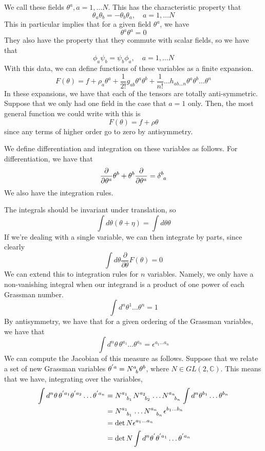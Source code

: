 \documentclass[11pt, oneside]{article}   	%
\theoremstyle{slanted}
\begin{document}
We call these fields $ \theta ^ a , a  = 1, \dots N $. 
This has the characteristic property that 
\[
 \theta_ a \theta _ b  =  - \theta_ b \theta _ a , \quad a = 1 , \dots N 
\] 
This in particular implies that 
for a given field $ \theta ^ a $, we have 
\[
 \theta ^ a \theta ^ a  =0
\] They also 
have the property that they commute with 
scalar fields, 
so we have that 
\[
 \phi _ a \psi _ b  = \psi _ b \phi _ a , \quad a = 1 , \dots N 
\] 
With this data, we can define functions 
of these variables as a finite expansion.  
\[
 F \left( \theta  \right)  = f + \rho _ a \theta ^ a 	
 + \frac{1}{2 ! }g _{ ab } \theta ^a \theta ^ b + \frac{1}{n ! }\dots h_{ ab \dots n } \theta ^ a \theta ^ b 
 \dots \theta ^ n 
\] In these 
expansions, we have that each of the 
tensors are totally anti-symmetric.
Suppose that we only had one field 
in the case that $ a = 1 $ only. 
Then, the most 
general function we could write with this is 
\[
 F \left( \theta  \right)   = f + \rho \theta 
\] since any terms of higher order 
go to zero by antisymmetry. 

We define differentiation and 
integration on these variables as follows.
For differentiation, we have that 
\[
 \frac{\partial}{\partial \theta ^ a  } \theta ^ b + \theta ^ b \frac{\partial   }{\partial  \theta ^ a }  
  = \delta \indices{ ^ b _ a }  
\] We 
also have the integration rules. 

The integrals should be invariant under 
translation, so 
\[
	\int d \theta \left( \theta + \eta  \right)   = \int d \theta \theta 
\] If we're dealing with a single variable, 
we can then integrate by parts, since clearly 
\[
	\int d \theta \frac{\partial   }{\partial  \theta }  F \left( \theta  \right)    = 0 	 
\]  We can extend this to 
integration rules for $ n $ variables. 
Namely, we only have a non-vanishing integral when 
our integrand is a product of one power 
of each Grassman number.
\[
 \int d ^ n \theta ^ 1 \dots \theta ^ n  = 1 
\] By antisymmetry, we have that for a 
given ordering of the Grassman variables, we have that 
\[
 \int d ^ n \theta \, \theta ^{ a_1 } \dots \theta ^{ a _ n  }
  = \epsilon ^{ a_1 \dots a_ n} 
\] We can compute the Jacobian of 
this measure as follows. Suppose 
that we relate a set of new Grassman 
variables $ \theta^{  ' a  }  = N \indices{^ a _ b } \theta ^ b  $, 
where $ N \in GL \left( 2 , \mathbb{ C }  \right)   $. 
This means that 
we have, integrating over the variables, 
\begin{align*}
	\int d ^ n \theta \, \theta ^{ ' a_1  } \theta ^{ ' a_2  } \dots \theta ^{  ' a_ n  } 
	&=  N \indices{ ^{ a_1 } _{ b_ 1 } } N \indices{ ^{ a_2  } _{ b_2 } } 
	\dots N \indices{ ^{ a_n  } _{ b_n  }  } \int d^ n \theta ^{ b_ 1 } \dots \theta ^{ b _ n }  \\
	&=  N \indices{ ^{ a_1 } _{ b_1 }  } \dots N \indices{ ^{ a_ n } _{b _ n } } 
	\epsilon ^{ b_ 1 \dots b _ n }  \\
	&=  \det N \epsilon ^{ a_1 \dots a_  n }  \\
	&=  \det N \int d ^ n \theta ^{  ' } \theta^{ ' a_1 } \dots \theta ^{  ' a _n  }  
\end{align*} 
\end{document}
